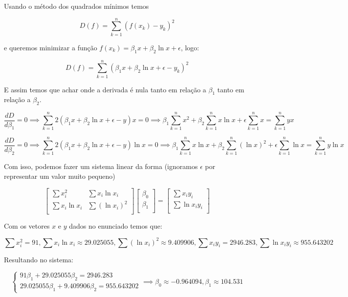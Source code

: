 \documentclass[11pt]{article}
\begin{document}
\begin{exerc}
\begin{enumerate}[a.]

Usando o método dos quadrados mínimos temos

$$D(f) = \sum_{k=1}^{n}(f(x_k) - y_k)^2$$

e queremos minimizar a função $f(x_k) = \beta_1 x + \beta_2 \ln{x} + \epsilon$, logo:

$$D(f) = \sum_{k=1}^{n}(\beta_1 x + \beta_2 \ln{x} + \epsilon - y_k)^2$$

E assim temos que achar onde a derivada é nula tanto em relação a $\beta_1$ tanto em relação a $\beta_2$.

$$\frac{dD}{d\beta_1} = 0 \implies \sum_{k=1}^{n} 2(\beta_1 x + \beta_2 \ln{x} + \epsilon - y) x = 0 \implies \beta_1 \sum_{k=1}^{n} x^2 + \beta_2 \sum_{k=1}^{n} x\ln{x} + \epsilon \sum_{k=1}^{n} x = \sum_{k=1}^{n} yx$$

$$\frac{dD}{d\beta_2} = 0 \implies \sum_{k=1}^{n} 2(\beta_1 x + \beta_2 \ln{x} + \epsilon - y) \ln{x} = 0 \implies \beta_1 \sum_{k=1}^{n} x \ln{x} + \beta_2 \sum_{k=1}^{n} (\ln{x})^2 + \epsilon \sum_{k=1}^{n} \ln{x} = \sum_{k=1}^{n} y \ln{x}$$

Com isso, podemos fazer um sistema linear da forma (ignoramos $\epsilon$ por representar um valor muito pequeno)

$$
\begin{bmatrix}
	\sum x_i^2 & \sum x_i \ln{x_i}\\
	\sum x_i \ln{x_i} & \sum (\ln{x_i})^2\\
\end{bmatrix}
\begin{bmatrix}
	\beta_0\\
	\beta_1\\
\end{bmatrix}
=
\begin{bmatrix}
	\sum x_i y_i\\
	\sum \ln{x_i} y_i\\
\end{bmatrix}
$$

Com os vetores $x$ e $y$ dados no enunciado temos que:

$$\sum x_i^2 = 91, \sum x_i \ln{x_i} \approx 29.025055, \sum (\ln{x_i})^2 \approx 9.409906, \sum x_i y_i = 2946.283, \sum \ln{x_i} y_i \approx 955.643202$$

Resultando no sistema:

$$
\begin{cases}
91\beta_1 + 29.025055\beta_2 = 2946.283\\
29.025055\beta_1 + 9.409906\beta_2 = 955.643202
\end{cases}
\implies
\beta_0 \approx -0.964094, \beta_1 \approx 104.531 
$$

\end{enumerate}
\end{exerc}
\end{document}
